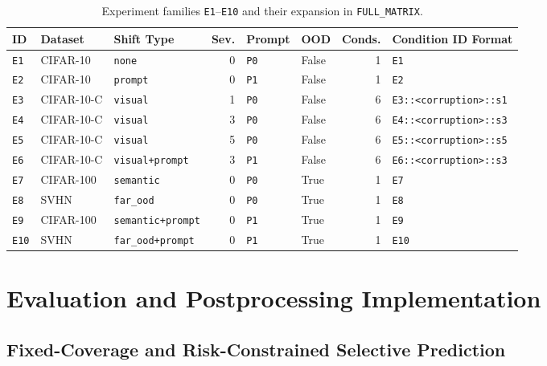 \documentclass[11pt,a4paper]{article}
\begin{document}
\begin{table}[!htbp]
\centering
\caption{Experiment families \texttt{E1}--\texttt{E10} and their expansion in \texttt{FULL\_\allowbreak{}MATRIX}.}
\label{tab:experiments}
\setlength{\tabcolsep}{3.5pt}\footnotesize\begin{tabularx}{\textwidth}{l l L{0.14\textwidth} r l l r Y}
\toprule
\textbf{ID} & \textbf{Dataset} & \textbf{Shift Type} & \textbf{Sev.} & \textbf{Prompt} & \textbf{OOD} & \textbf{Conds.} & \textbf{Condition ID Format} \\
\midrule
\texttt{E1} & CIFAR-10 & \texttt{none} & 0 & \texttt{P0} & False & 1 & \texttt{E1} \\
\texttt{E2} & CIFAR-10 & \texttt{prompt} & 0 & \texttt{P1} & False & 1 & \texttt{E2} \\
\texttt{E3} & CIFAR-10-C & \texttt{visual} & 1 & \texttt{P0} & False & 6 & \texttt{E3::<corruption>::s1} \\
\texttt{E4} & CIFAR-10-C & \texttt{visual} & 3 & \texttt{P0} & False & 6 & \texttt{E4::<corruption>::s3} \\
\texttt{E5} & CIFAR-10-C & \texttt{visual} & 5 & \texttt{P0} & False & 6 & \texttt{E5::<corruption>::s5} \\
\texttt{E6} & CIFAR-10-C & \texttt{visual+prompt} & 3 & \texttt{P1} & False & 6 & \texttt{E6::<corruption>::s3} \\
\texttt{E7} & CIFAR-100 & \texttt{semantic} & 0 & \texttt{P0} & True & 1 & \texttt{E7} \\
\texttt{E8} & SVHN & \texttt{far\_\allowbreak{}ood} & 0 & \texttt{P0} & True & 1 & \texttt{E8} \\
\texttt{E9} & CIFAR-100 & \texttt{semantic+prompt} & 0 & \texttt{P1} & True & 1 & \texttt{E9} \\
\texttt{E10} & SVHN & \texttt{far\_\allowbreak{}ood+prompt} & 0 & \texttt{P1} & True & 1 & \texttt{E10} \\
\bottomrule
\end{tabularx}
\end{table}

\section{Evaluation and Postprocessing Implementation}

\subsection{Fixed-Coverage and Risk-Constrained Selective Prediction}
\end{document}
